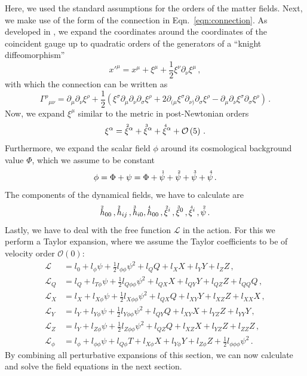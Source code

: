 \documentclass[notitlepage,a4paper,aps,prd,onecolumn,superscriptaddress,nofootinbib,groupedaddress,longbibliography]{revtex4-2}
\newcommand{\order}[2]{\accentset{#2}{#1}}
\begin{document}
Here, we used the standard assumptions for the orders of the matter fields. Next, we make use of the form of the connection in Eqn.~\eqref{eqn:connection}. As developed in \cite{Flathmann:2021khc}, we expand the coordinates around the coordinates of the coincident gauge up to quadratic orders of the generators of a ``knight diffeomorphism''
\begin{equation}
x'^{\mu} = x^{\mu} + \xi^{\mu} + \frac{1}{2}\xi^{\nu}\partial_{\nu}\xi^{\mu}\,,
\end{equation}
with which the connection can be written as
\begin{equation}
\Gamma^{\rho}{}_{\mu\nu} = \partial_{\mu}\partial_{\nu}\xi^{\rho} + \frac{1}{2}\left(\xi^{\sigma}\partial_{\mu}\partial_{\nu}\partial_{\sigma}\xi^{\rho} + 2\partial_{(\mu}\xi^{\sigma}\partial_{\nu)}\partial_{\sigma}\xi^{\rho} - \partial_{\mu}\partial_{\nu}\xi^{\sigma}\partial_{\sigma}\xi^{\rho}\right)\,.
\end{equation}
Now, we expand $\xi^{\mu}$ similar to the metric in post-Newtonian orders
\begin{equation}
\xi^{\alpha}=\order{\xi}{2}^{\alpha}+\order{\xi}{3}^{\alpha}+\order{\xi}{4}^{\alpha}+\mathcal{O}\left(5\right)\,.
\end{equation}
Furthermore, we expand the scalar field $\phi$ around its cosmological background value $\Phi$, which we assume to be constant
\begin{equation}
    \phi=\Phi+\psi=\Phi+\order{\psi}{1}+\order{\psi}{2}+\order{\psi}{3}+\order{\psi}{4}\,.
\end{equation}
The components of the dynamical fields, we have to calculate are
\begin{equation}
\order{h}{2}_{00}\,,\order{h}{2}_{ij}\,,\order{h}{3}_{i0},\order{h}{4}_{00}\,,\order{\xi}{2}^{i}\,,\order{\xi}{3}^{0}\,,\order{\xi}{4}^{i}\,, \order{\psi}{2}\,.
\end{equation}
Lastly, we have to deal with the free function $\mathcal{L}$ in the action. For this we perform a Taylor expansion, where we assume the Taylor coefficients to be of velocity order $\mathcal{O}(0)$:
\begin{align}\label{eqn:LXYphiTaylor}
\mathcal{L} &= l_0+l_\phi\psi+\frac{1}{2}l_{\phi\phi}\psi^2+l_Q Q+l_XX+l_YY+l_ZZ \,, \nonumber \\
\mathcal{L}_Q &= l_Q+l_{T\phi}\psi+\frac{1}{2}l_{Q\phi\phi}\psi^2+l_{QX}X+l_{QY}Y+l_{QZ}Z+l_{QQ}Q \,, \nonumber \\
\mathcal{L}_X &= l_X+l_{X\phi}\psi+\frac{1}{2}l_{X\phi\phi}\psi^2+l_{QX}Q+l_{XY}Y+l_{XZ}Z+l_{XX}X \,, \nonumber \\
\mathcal{L}_Y &= l_Y+l_{Y\phi}\psi+\frac{1}{2}l_{Y\phi\phi}\psi^2+l_{QY}Q+l_{XY}X+l_{YZ}Z+l_{YY}Y \,, \nonumber \\
\mathcal{L}_Z &= l_Y+l_{Z\phi}\psi+\frac{1}{2}l_{Z\phi\phi}\psi^2+l_{QZ}Q+l_{XZ}X+l_{YZ}Z+l_{ZZ}Z \,, \nonumber \\
\mathcal{L}_\phi &= l_\phi +l_{\phi\phi}\psi+l_{Q\phi}T+l_{X\phi}X+l_{Y\phi}Y+l_{Z\phi}Z+\frac{1}{2}l_{\phi\phi\phi}\psi^2 \,.
\end{align}
By combining all perturbative expansions of this section, we can now calculate and solve the field equations in the next section.
\end{document}
